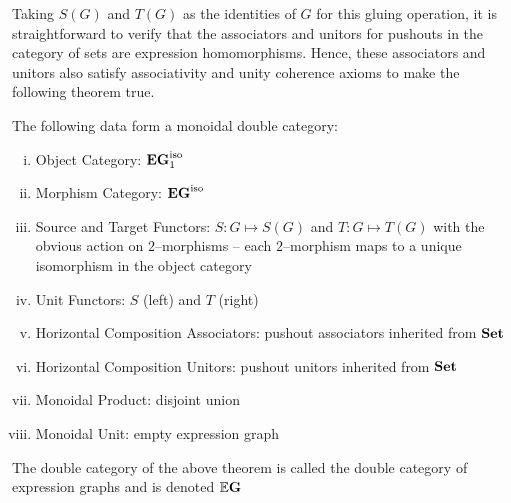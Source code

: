 \documentclass[./Thick_TQFTs_and_Quantum_Information.tex]{subfiles}
\begin{document}
Taking $S(G)$ and $T(G)$ as the identities of $G$ for this gluing operation, it
is straightforward to verify that the associators and unitors for pushouts in
the category of sets are expression homomorphisms. Hence, these associators and
unitors also satisfy associativity and unity coherence axioms to make the
following theorem true. 

\begin{thm}
The following data form a monoidal double category:
\begin{enumerate}[(i)]
\setlength{\itemsep}{0pt}
\item Object Category: $\textbf{EG}_1^{\text{iso}}$
\item Morphism Category: $\textbf{EG}^{\text{iso}}$
\item Source and Target Functors: $S : G \mapsto S(G)$ and $T : G \mapsto T(G)$
with the obvious action on $2$--morphisms -- each $2$--morphism maps to a unique
isomorphism in the object category
\item Unit Functors: $S$ (left) and $T$ (right)
\item Horizontal Composition Associators: pushout associators inherited from
$\textbf{Set}$
\item Horizontal Composition Unitors: pushout unitors inherited from $\textbf{Set}$
\item Monoidal Product: disjoint union
\item Monoidal Unit: empty expression graph
\end{enumerate}
\end{thm}

\begin{defn}
The double category of the above theorem is called the double category of
expression graphs and is denoted $\mathbb{E}\textbf{G}$
\end{defn}
\end{document}
